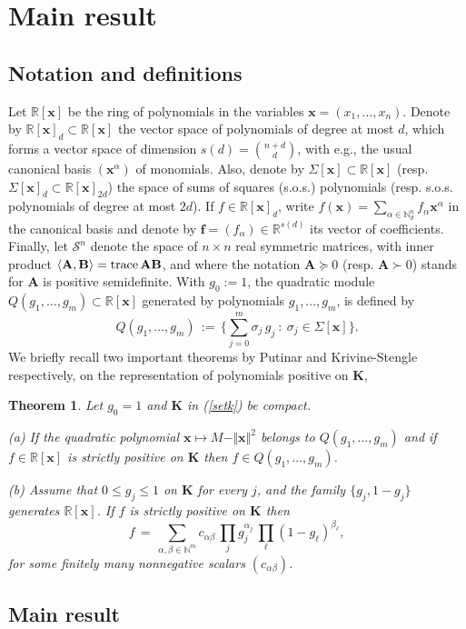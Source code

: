\documentclass[11pt]{article}
\newtheorem{theorem}{Theorem}[section]
\numberwithin{equation}{section}
\def\la{\langle}
\def\ra{\rangle}
\def\x{\mathbf{x}}
\def\R{\mathbb{R}}
\def\N{\mathbb{N}}
\def\K{\mathbf{K}}
\def\A{\mathbf{A}}
\def\B{\mathbf{B}}
\def\f{\mathbf{f}}
\def\s{\mathcal{S}}
\def\s{\mathcal{S}}
\def\la{\langle}
\def\ra{\rangle}
\begin{document}
\section{Main result}

\subsection{Notation and definitions}
Let $\R[\x]$ be the ring of polynomials in the variables
$\x=(x_1,\ldots,x_n)$.
Denote by $\R[\x]_d\subset\R[\x]$ the vector space of
polynomials of degree at most $d$, which forms a vector space of dimension $s(d)={n+d\choose d}$, with e.g.,
the usual canonical basis $(\x^\alpha)$ of monomials.
Also, denote by $\Sigma[\x]\subset\R[\x]$ (resp. $\Sigma[\x]_d\subset\R[\x]_{2d}$)
the space of sums of squares (s.o.s.) polynomials (resp. s.o.s. polynomials of degree at most $2d$). 
If $f\in\R[\x]_d$, write
$f(\x)=\sum_{\alpha\in\N^n_d}f_\alpha \x^\alpha$ in the canonical basis and
denote by $\f=(f_\alpha)\in\R^{s(d)}$ its vector of coefficients. Finally, let $\s^n$ denote the space of 
$n\times n$ real symmetric matrices, with inner product $\la \A,\B\ra ={\rm trace}\,\A\B$, and where the notation
$\A\succeq0$ (resp. $\A\succ0$) stands for $\A$ is positive semidefinite.  With $g_0:=1$, the quadratic module $Q(g_1,\ldots,g_m)\subset\R[\x]$ generated by
polynomials $g_1,\ldots,g_m$, is defined by
\[Q(g_1,\ldots,g_m)\,:=\,\{\sum_{j=0}^m\sigma_j\,g_j\::\:\sigma_j\in\Sigma[\x]\}.\]
We briefly recall two important theorems by Putinar \cite{Putinar93} and Krivine-Stengle \cite{Krivine64a,Stengle74} respectively,
on the representation of polynomials positive on $\K$,
\begin{theorem}
Let $g_0=1$ and  $\K$ in (\ref{setk}) be compact.

(a) If the quadratic polynomial $\x\mapsto M-\Vert\x\Vert^2$
belongs to $Q(g_1,\ldots,g_m)$ and if $f\in\R[\x]$ is strictly positive on $\K$ then $f\in Q(g_1,\ldots,g_m)$.

(b) Assume that $0\leq g_j\leq 1$ on $\K$ for every $j$, and the family $\{g_j,1-g_j\}$ generates $\R[\x]$. If $f$ is strictly positive on $\K$ then 
\[f\,=\,\sum_{\alpha,\beta\in\N^m}c_{\alpha\beta}\,\prod_{j}g_j^{\alpha_j}\,\prod_{\ell}(1-g_\ell)^{\beta_\ell},\]
for some finitely many nonnegative scalars $(c_{\alpha\beta})$.
\end{theorem}
\subsection{Main result}
\end{document}
